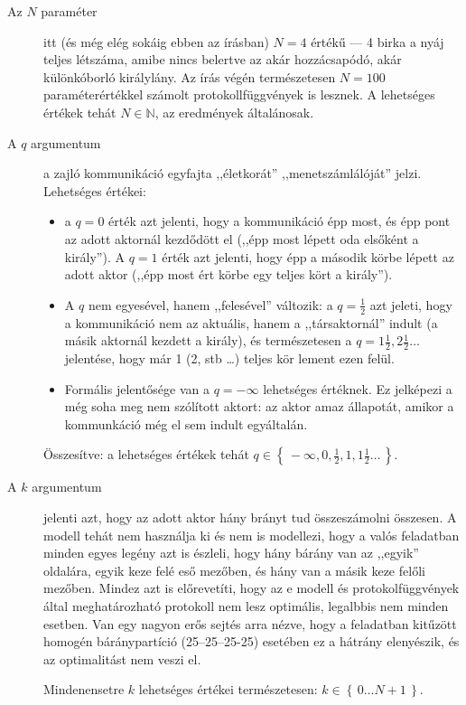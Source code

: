 \documentclass{article}
\newcommand{\setOf}[1]{\left\lbrace\,#1\,\right\rbrace}
\begin{document}
	\begin{description}
		\item[Az $N$ paraméter] itt (és még elég sokáig ebben az írásban) $N=4$ értékű --- 4 birka a nyáj teljes létszáma, amibe nincs belertve az akár hozzácsapódó, akár különkóborló királylány.
		Az írás végén természetesen $N=100$ paraméterértékkel számolt protokollfüggvények is lesznek.
		A lehetséges értékek tehát $N \in \mathbb N$, az eredmények általánosak.

		\item[A $q$ argumentum] a zajló kommunikáció egyfajta ,,életkorát'' ,,menetszámlálóját'' jelzi.
		Lehetséges értékei:
		\begin{itemize}
			\item a $q = 0$ érték azt jelenti, hogy a kommunikáció épp most, és épp pont az adott aktornál kezdődött el (,,épp most lépett oda elsőként a király''). A $q = 1$ érték azt jelenti, hogy épp a második körbe lépett az adott aktor (,,épp most ért körbe egy teljes kört a király'').
			\item A $q$ nem egyesével, hanem ,,felesével'' változik: a $q = \frac12$ azt jeleti, hogy a kommunikáció nem az aktuális, hanem a ,,társaktornál'' indult (a másik aktornál kezdett a király), és természetesen a $q = 1\frac12, 2\frac12 \dots$ jelentése, hogy már 1 (2, stb \dots) teljes kör lement ezen felül.
			\item Formális jelentősége van a $q = -\infty$ lehetséges értéknek. Ez jelképezi a még soha meg nem szólított aktort: az aktor amaz állapotát, amikor a kommunkáció még el sem indult egyáltalán.
		\end{itemize}
		Összesítve: a lehetséges értékek tehát $q \in \setOf{-\infty, 0, \frac12, 1, 1\frac12\dots}$.

		\item[A $k$ argumentum] jelenti azt, hogy az adott aktor hány brányt tud összeszámolni összesen.
		A modell tehát nem használja ki és nem is modellezi, hogy a valós feladatban minden egyes legény azt is észleli, hogy hány bárány van az ,,egyik'' oldalára, egyik keze felé eső mezőben, és hány van a másik keze felőli mezőben. Mindez azt is előrevetíti, hogy az e modell és protokolfüggvények által meghatározható protokoll nem lesz optimális, legalbbis nem minden esetben. Van egy nagyon erős sejtés arra nézve, hogy a feladatban kitűzött homogén báránypartíció (25--25--25-25) esetében ez a hátrány elenyészik, és az optimalitást nem veszi el.

		Mindenensetre $k$ lehetséges értékei természetesen: $k\in\setOf{0\dots N+1}$.


\end{description}
\end{document}
